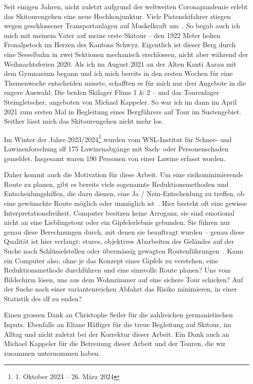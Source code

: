 


Seit einigen Jahren, nicht zuletzt aufgrund der weltweiten Coronapandemie erlebt das Skitourengehen eine neue Hochkonjunktur. Viele Pistenskifahrer stiegen wegen geschlossener Transportanlagen auf Muskelkraft um~\cite{sacCoronaTrend}. So begab auch ich mich mit meinem Vater auf meine erste Skitour – den 1922 Meter hohen Fronalpstock im Herzen des Kantons Schwyz. Eigentlich ist dieser Berg durch eine Sesselbahn in zwei Sektionen mechanisch erschlossen, nicht aber während der Weihnachtsferien 2020.
Als ich im August 2021 an der Alten Kanti Aarau mit dem Gymnasium begann und ich mich bereits in den ersten Wochen für eine Themenwoche entscheiden musste, schafften es für mich nur drei Angebote in die engere Auswahl: Die beiden Skilager Flims 1 \& 2 – und das Tourenlager Steingletscher, angeboten von Michael Kappeler. So war ich im dann im April 2021 zum ersten Mal in Begleitung eines Bergführers auf Tour im Sustengebiet. Seither lässt mich das Skitourengehen nicht mehr los.

Im Winter der Jahre 2023/2024\footnote{1. Oktober 2023 -- 26. März 2024} wurden vom WSL-Institut für Schnee- und Lawinenforschung \gls{slf} 175 Lawinenabgänge mit Sach- oder Personenschaden gemeldet. Insgesamt waren 190 Personen von einer Lawine erfasst worden.~\cite{slfWinterbericht202324}

Daher kommt auch die Motivation für diese Arbeit. Um eine risikominimierende Route zu planen, gibt es bereits viele sogenannte Reduktionsmethoden und Entscheidungshilfen, die dazu dienen, eine Ja / Nein-Entscheidung zu treffen, ob eine gewünschte Route möglich oder unmöglich ist~\cite{skitourenguruReduktionsmethoden}\cite{harveyrhynerschweizerlawinenkunde}.
Hier besteht oft eine gewisse Interpretationsfreiheit. Computer besitzen keine Arroganz, sie sind emotional nicht an eine Lieblingstour oder ein Gipfelerlebnis gebunden. Sie führen nur genau diese Berechnungen durch, mit denen sie beauftragt wurden – genau diese Qualität ist hier verlangt: stures, objektives Abarbeiten des Geländes auf der Suche nach Schlüsselstellen oder übermässig gewagten Routenführungen~\cite{harveyrhynerschweizerlawinenkunde}. Kann ein Computer also, ohne je das Konzept eines Gipfels zu verstehen, eine Reduktionsmethode durchführen und eine sinnvolle Route planen? Uns vom Bildschirm lösen, uns aus dem Wohnzimmer auf eine sichere Tour schicken? 
Auf der Suche nach einer variantenreichen Abfahrt das Risiko minimieren, in einer Statistik des \gls{slf} zu enden?

Einen grossen Dank an Christophe Seiler für die zahlreichen germanistischen Inputs. Ebenfalls an Eliane Häfliger für die treue Begleitung auf Skitour, im Alltag und nicht zuletzt bei der Korrektur dieser Arbeit. Ein Dank auch an Michael Kappeler für die Betreuung dieser Arbeit und der Touren, die wir zusammen unternommen haben.


